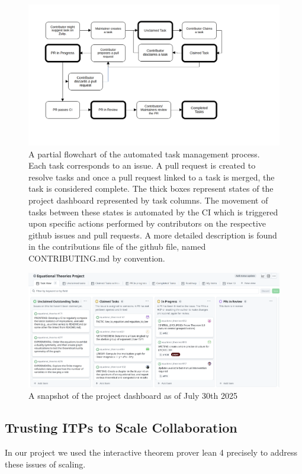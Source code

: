 \begin{figure}[t]
    \centering
    \includegraphics[width=1.0\textwidth]{proj_mgmt_figures/task_flowchart.png}
    \caption{\label{fig:proj_mgmt_flow} A partial flowchart of the automated task management process. Each task corresponds to an issue. A pull request is created to resolve tasks and once a pull request linked to a task is merged, the task is considered complete. The thick boxes represent states of the project dashboard represented by task columns. The movement of tasks between these states is automated by the CI which is triggered upon specific actions performed by contributors on the respective github issues and pull requests. A more detailed description is found in the contributions file of the github file, named CONTRIBUTING.md by convention.}
\end{figure}

\begin{figure}[t]
    \centering
    \includegraphics[width=1.0\textwidth]{proj_mgmt_figures/proj_dash_snapshot.png}
    \caption{\label{fig:proj_dashboard} A snapshot of the project dashboard as of July 30th 2025}
\end{figure}
\subsection{Trusting ITPs to Scale Collaboration}
In our project we used the interactive theorem prover lean 4 \cite{the_lean4_paper} precisely to address these issues of scaling.

